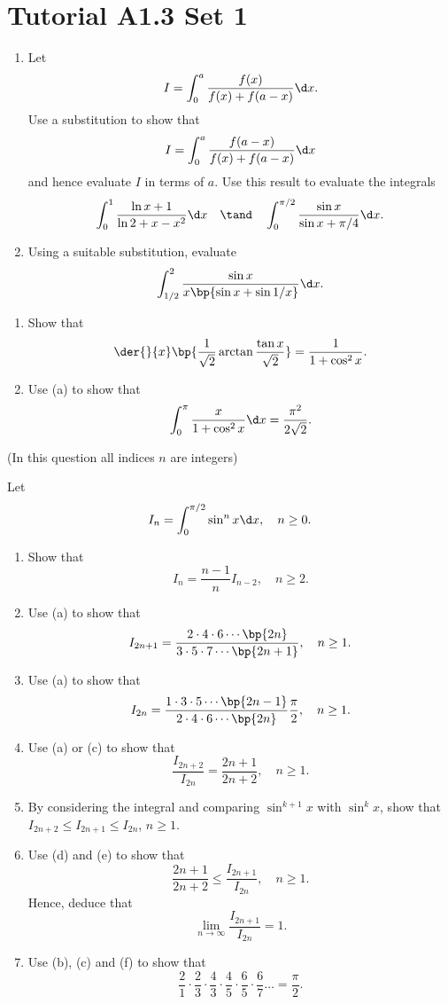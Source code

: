\section{Tutorial A1.3 Set 1}

\begin{problem}
    \begin{enumerate}
        \item Let \[I = \int_0^a \frac{f(x)}{f(x) + f(a-x)} \d x.\] Use a substitution to show that \[I = \int_0^a \frac{f(a - x)}{f(x) + f(a-x)} \d x\] and hence evaluate $I$ in terms of $a$. Use this result to evaluate the integrals \[\int_0^1 \frac{\ln{x+1}}{\ln{2 + x - x^2}} \d x \quad \tand \quad \int_0^{\pi/2} \frac{\sin x}{\sin{x + \pi/4}} \d x.\]
        \item Using a suitable substitution, evaluate \[\int_{1/2}^{2} \frac{\sin x}{x \bp{\sin x + \sin 1/x}} \d x.\]
    \end{enumerate}
\end{problem}

\begin{problem}
    \begin{enumerate}
        \item Show that \[\der{}{x} \bp{\frac1{\sqrt2} \arctan \frac{\tan x}{\sqrt2}} = \frac1{1 + \cos^2 x}.\]
        \item Use (a) to show that \[\int_0^\pi \frac{x}{1 + \cos^2 x} \d x = \frac{\pi^2}{2\sqrt2}.\]
    \end{enumerate}
\end{problem}

\begin{problem}
    (In this question all indices $n$ are integers)

    Let \[I_n = \int_0^{\pi/2} \sin^n x \d x, \quad n \geq 0.\]

    \begin{enumerate}
        \item Show that \[I_n = \frac{n-1}{n} I_{n-2}, \quad n \geq 2.\]
        \item Use (a) to show that \[I_{2n+1} = \frac{2 \cdot 4 \cdot 6 \cdots \bp{2n}}{3 \cdot 5 \cdot 7 \cdots \bp{2n+1}}, \quad n \geq 1.\]
        \item Use (a) to show that \[I_{2n} = \frac{1 \cdot 3 \cdot 5 \cdots \bp{2n-1}}{2 \cdot 4 \cdot 6 \cdots \bp{2n}} \frac\pi2, \quad n \geq 1.\]
        \item Use (a) or (c) to show that \[\frac{I_{2n+2}}{I_{2n}} = \frac{2n+1}{2n+2}, \quad n \geq 1.\]
        \item By considering the integral and comparing $\sin^{k+1} x$ with $\sin^k x$, show that $I_{2n+2} \leq I_{2n+1} \leq I_{2n}$, $n \geq 1.$
        \item Use (d) and (e) to show that \[\frac{2n+1}{2n+2} \leq \frac{I_{2n+1}}{I_{2n}}, \quad n \geq 1.\] Hence, deduce that \[\lim_{n \to \infty} \frac{I_{2n+1}}{I_{2n}} = 1.\]
        \item Use (b), (c) and (f) to show that \[\frac21 \cdot \frac23 \cdot \frac43 \cdot \frac45 \cdot \frac65 \cdot \frac67 \dots = \frac\pi2.\]
    \end{enumerate}
\end{problem}

